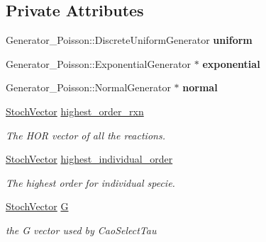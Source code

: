 \subsection*{Private Attributes}
\begin{CompactItemize}
\item 
\hypertarget{class_tau_leaping_b1fa7a94522e085657ba7821459d6811}{
Generator\_\-Poisson::DiscreteUniformGenerator \textbf{uniform}}
\label{class_tau_leaping_b1fa7a94522e085657ba7821459d6811}

\item 
\hypertarget{class_tau_leaping_d077119fc1e92667debd6dee2da11c0e}{
Generator\_\-Poisson::ExponentialGenerator $\ast$ \textbf{exponential}}
\label{class_tau_leaping_d077119fc1e92667debd6dee2da11c0e}

\item 
\hypertarget{class_tau_leaping_9dd084da9fe62de775632d4d9d6fc215}{
Generator\_\-Poisson::NormalGenerator $\ast$ \textbf{normal}}
\label{class_tau_leaping_9dd084da9fe62de775632d4d9d6fc215}

\item 
\hyperlink{class_stoch_vector}{StochVector} \hyperlink{class_tau_leaping_47115e6a88b50e191eba554b8875a656}{highest\_\-order\_\-rxn}
\begin{CompactList}\small\item\em The HOR vector of all the reactions. \item\end{CompactList}\item 
\hyperlink{class_stoch_vector}{StochVector} \hyperlink{class_tau_leaping_caef70274678c4f38167d94953edad96}{highest\_\-individual\_\-order}
\begin{CompactList}\small\item\em The highest order for individual specie. \item\end{CompactList}\item 
\hypertarget{class_tau_leaping_b945cb92157931e416046a31892ccb02}{
\hyperlink{class_stoch_vector}{StochVector} \hyperlink{class_tau_leaping_b945cb92157931e416046a31892ccb02}{G}}
\label{class_tau_leaping_b945cb92157931e416046a31892ccb02}

\begin{CompactList}\small\item\em the G vector used by CaoSelectTau \item\end{CompactList}\end{CompactItemize}


